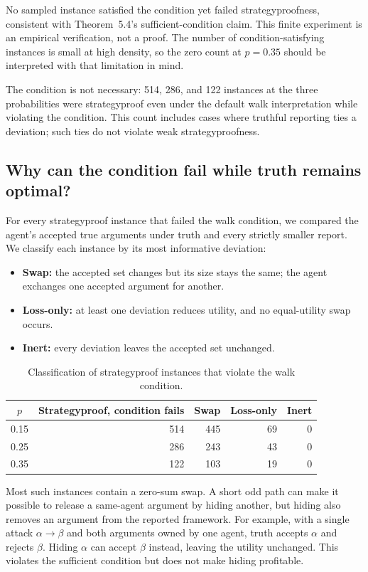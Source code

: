 \documentclass[11pt,a4paper]{article}
\begin{document}
No sampled instance satisfied the condition yet failed strategyproofness, consistent with Theorem~5.4's sufficient-condition claim. This finite experiment is an empirical verification, not a proof. The number of condition-satisfying instances is small at high density, so the zero count at $p=0.35$ should be interpreted with that limitation in mind.

The condition is not necessary: 514, 286, and 122 instances at the three probabilities were strategyproof even under the default walk interpretation while violating the condition. This count includes cases where truthful reporting ties a deviation; such ties do not violate weak strategyproofness.

\subsection{Why can the condition fail while truth remains optimal?}
For every strategyproof instance that failed the walk condition, we compared the agent's accepted true arguments under truth and every strictly smaller report. We classify each instance by its most informative deviation:
\begin{itemize}
\item \textbf{Swap:} the accepted set changes but its size stays the same; the agent exchanges one accepted argument for another.
\item \textbf{Loss-only:} at least one deviation reduces utility, and no equal-utility swap occurs.
\item \textbf{Inert:} every deviation leaves the accepted set unchanged.
\end{itemize}
\begin{table}[ht]
\centering
\begin{tabular}{@{}crrrr@{}}
\toprule
$p$ & Strategyproof, condition fails & Swap & Loss-only & Inert\\
\midrule
0.15 & 514 & 445 & 69 & 0\\
0.25 & 286 & 243 & 43 & 0\\
0.35 & 122 & 103 & 19 & 0\\
\bottomrule
\end{tabular}
\caption{Classification of strategyproof instances that violate the walk condition.}
\label{tab:classification}
\end{table}

Most such instances contain a zero-sum swap. A short odd path can make it possible to release a same-agent argument by hiding another, but hiding also removes an argument from the reported framework. For example, with a single attack $\alpha\to\beta$ and both arguments owned by one agent, truth accepts $\alpha$ and rejects $\beta$. Hiding $\alpha$ can accept $\beta$ instead, leaving the utility unchanged. This violates the sufficient condition but does not make hiding profitable.
\end{document}
